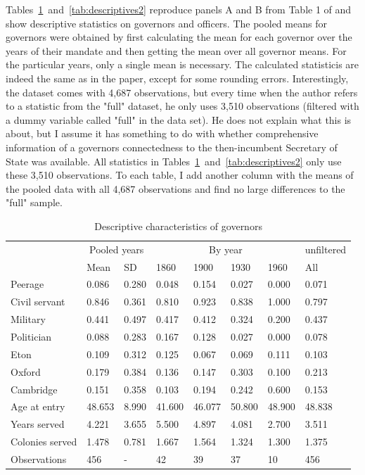 \documentclass[a4paper]{article}\usepackage[]{graphicx}\usepackage[]{color}
\begin{document}
\hspace*{5mm} Tables~\ref{tab:descriptives1}~and~\ref{tab:descriptives2} reproduce panels A and B from Table 1 of \cite{guoxu2018} and show descriptive statistics on governors and officers. The pooled means for governors were obtained by first calculating the mean for each governor over the years of their mandate and then getting the mean over all governor means. For the particular years, only a single mean is necessary. The calculated statisticis are indeed the same as in the paper, except for some rounding errors. Interestingly, the dataset comes with 4,687 observations, but every time when the author refers to a statistic from the "full" dataset, he only uses 3,510 observations (filtered with a dummy variable called "full" in the data set). He does not explain what this is about, but I assume it has something to do with whether comprehensive information of a governors connectedness to the then-incumbent Secretary of State was available. All statistics in Tables~\ref{tab:descriptives1}~and~\ref{tab:descriptives2} only use these 3,510 observations. To each table, I add another column with the means of the pooled data with all 4,687 observations and find no large differences to the "full" sample.   
\begin{table}[!h]

\caption{\label{tab:descriptives1}Descriptive characteristics of governors}
\centering
\fontsize{7}{9}\selectfont
\begin{tabular}[t]{llllllll}
\toprule
\multicolumn{1}{c}{ } & \multicolumn{2}{c}{Pooled years} & \multicolumn{4}{c}{By year} & \multicolumn{1}{c}{unfiltered} \\
\cmidrule(l{3pt}r{3pt}){2-3} \cmidrule(l{3pt}r{3pt}){4-7} \cmidrule(l{3pt}r{3pt}){8-8}
  & Mean & SD & 1860 & 1900 & 1930 & 1960 & All\\
\midrule
Peerage & 0.086 & 0.280 & 0.048 & 0.154 & 0.027 & 0.000 & 0.071\\
Civil servant & 0.846 & 0.361 & 0.810 & 0.923 & 0.838 & 1.000 & 0.797\\
Military & 0.441 & 0.497 & 0.417 & 0.412 & 0.324 & 0.200 & 0.437\\
Politician & 0.088 & 0.283 & 0.167 & 0.128 & 0.027 & 0.000 & 0.078\\
Eton & 0.109 & 0.312 & 0.125 & 0.067 & 0.069 & 0.111 & 0.103\\
Oxford & 0.179 & 0.384 & 0.136 & 0.147 & 0.303 & 0.100 & 0.213\\
Cambridge & 0.151 & 0.358 & 0.103 & 0.194 & 0.242 & 0.600 & 0.153\\
Age at entry & 48.653 & 8.990 & 41.600 & 46.077 & 50.800 & 48.900 & 48.838\\
Years served & 4.221 & 3.655 & 5.500 & 4.897 & 4.081 & 2.700 & 3.511\\
Colonies served & 1.478 & 0.781 & 1.667 & 1.564 & 1.324 & 1.300 & 1.375\\
Observations & 456 & - & 42 & 39 & 37 & 10 & 456\\
\bottomrule
\end{tabular}
\end{table}
\end{document}
